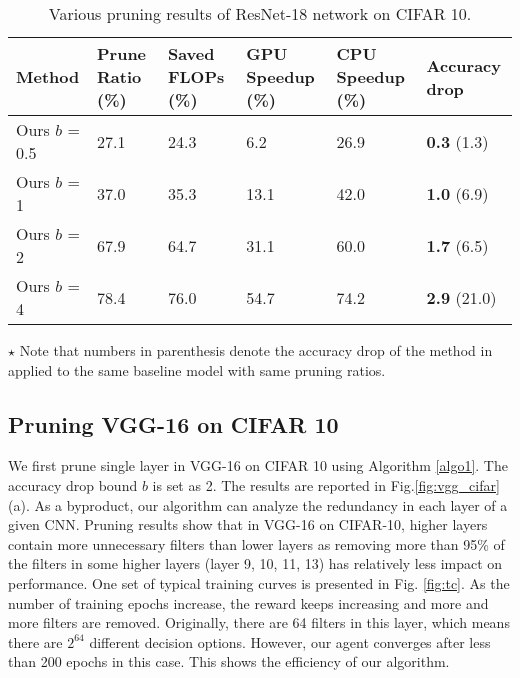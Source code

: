\documentclass[10pt,twocolumn,letterpaper]{article}
\begin{document}
\begin{table*}
  \caption{Various pruning results of ResNet-18 network on CIFAR 10.}
  \label{tl:resnet_cifar}
  \centering
  \begin{tabular}{llllll}
    \toprule

    Method     & Prune Ratio (\%)  & Saved FLOPs (\%)   & GPU Speedup (\%) & CPU Speedup (\%) & Accuracy drop \\
    \midrule
    
    Ours $b$ = 0.5 	   &  27.1	& 24.3 & 6.2	&26.9&  \textbf{0.3} (1.3)	\\

    Ours $b$ = 1 	   &  37.0	& 35.3 &13.1 	&42.0& \textbf{1.0} (6.9)	\\

    Ours $b$ = 2 	   &  67.9  & 64.7 & 31.1	&60.0& \textbf{1.7} (6.5)		\\

    Ours $b$ = 4 	   &  78.4	& 76.0 & 54.7	&74.2& \textbf{2.9} (21.0)		\\    

    \bottomrule
  \end{tabular}
  
        \begin{tablenotes}
      \small
      \item $\star$ Note that numbers in parenthesis denote the accuracy drop of the method in \cite{iclr17} applied to the same baseline model with same pruning ratios.
    \end{tablenotes}
    
\end{table*}




\subsection{Pruning VGG-16 on CIFAR 10}
\label{sec:vgg_cifar}

We first prune single layer in VGG-16 on CIFAR 10 using Algorithm \ref{algo1}. The accuracy drop bound $b$ is set as 2. The results are reported in Fig.\ref{fig:vgg_cifar} (a). As a byproduct, our algorithm can analyze the redundancy in each layer of a given CNN. Pruning results show that in VGG-16 on CIFAR-10, higher layers contain more unnecessary filters than lower layers as removing more than 95\% of the filters in some higher layers (layer 9, 10, 11, 13) has relatively less impact on performance. One set of typical training curves is presented in Fig. \ref{fig:tc}. As the number of training epochs increase, the reward keeps increasing and more and more filters are removed. Originally, there are 64 filters in this layer, which means there are $2^{64}$ different decision options. However, our agent converges after less than 200 epochs in this case. This shows the efficiency of our algorithm.
\end{document}
